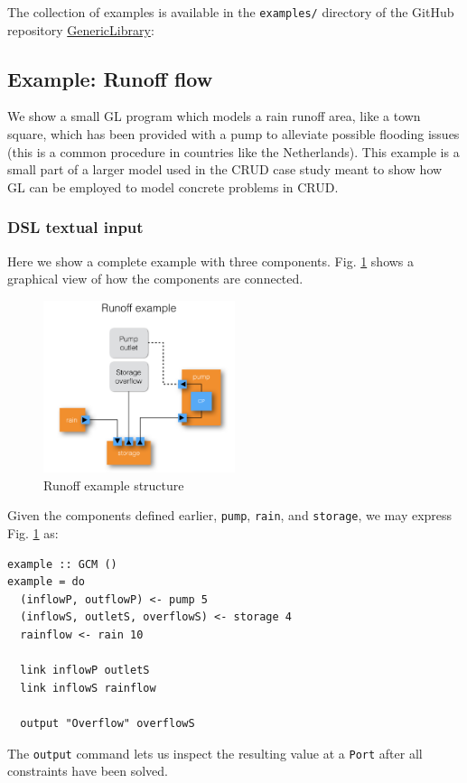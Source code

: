 The collection of examples is available in the \verb+examples/+ directory of the GitHub repository \href{https://github.com/GRACeFUL-project/GenericLibrary}{GenericLibrary}:


\subsection{Example: Runoff flow}
\label{example-runoff-flow}

We show a small GL program which models a rain runoff area, like a
town square, which has been provided with a pump to alleviate possible
flooding issues (this is a common procedure in countries like the
Netherlands).
%
This example is a small part of a larger model used in the CRUD case
study meant to show how GL can be employed to model concrete problems
in CRUD.


\subsubsection{DSL textual input}
\label{example-runoff-flow-dsl-textual-input}

Here we show a complete example with three components.
%
Fig. \ref{fig:RunoffEx} shows a graphical view of how the components
are connected.
%
\begin{figure}[htbp]
  \centering
\includegraphics[width=0.5\textwidth]{fig/RunoffExample.jpg}
  \caption{Runoff example structure}
  \label{fig:RunoffEx}
\end{figure}

Given the components defined earlier, \texttt{pump}, \texttt{rain}, and \texttt{storage},
we may express Fig. \ref{fig:RunoffEx} as:
\begin{verbatim}
example :: GCM ()
example = do
  (inflowP, outflowP) <- pump 5
  (inflowS, outletS, overflowS) <- storage 4
  rainflow <- rain 10

  link inflowP outletS
  link inflowS rainflow

  output "Overflow" overflowS
\end{verbatim}
The \texttt{output} command lets us inspect the resulting value at a \texttt{Port}
after all constraints have been solved.

